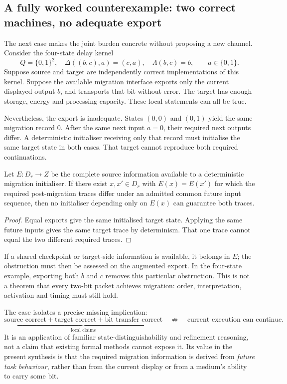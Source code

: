 \subsection{A fully worked counterexample: two correct machines, no adequate export}\label{subsec:exportcase}
The next case makes the joint burden concrete without proposing a new channel. Consider the four-state delay kernel
\[
 Q=\{0,1\}^2,\quad \Delta((b,c),a)=(c,a),\quad \Lambda(b,c)=b,
 \qquad a\in\{0,1\}.
\]
Suppose source and target are independently correct implementations of this kernel. Suppose the available migration interface exports only the current displayed output $b$, and transports that bit without error. The target has enough storage, energy and processing capacity. These local statements can all be true.

Nevertheless, the export is inadequate. States $(0,0)$ and $(0,1)$ yield the same migration record $0$. After the same next input $a=0$, their required next outputs differ. A deterministic initialiser receiving only that record must initialise the same target state in both cases. That target cannot reproduce both required continuations.

\begin{proposition}\label{prop:export}
Let $E:D_r\to Z$ be the complete source information available to a deterministic migration initialiser. If there exist $x,x'\in D_r$ with $E(x)=E(x')$ for which the required post-migration traces differ under an admitted common future input sequence, then no initialiser depending only on $E(x)$ can guarantee both traces.
\end{proposition}
\begin{proof}
Equal exports give the same initialised target state. Applying the same future inputs gives the same target trace by determinism. That one trace cannot equal the two different required traces.
\end{proof}
If a shared checkpoint or target-side information is available, it belongs in $E$; the obstruction must then be assessed on the augmented export. In the four-state example, exporting both $b$ and $c$ removes this particular obstruction. This is not a theorem that every two-bit packet achieves migration: order, interpretation, activation and timing must still hold.

The case isolates a precise missing implication:
\[
 \underbrace{\text{source correct} + \text{target correct} + \text{bit transfer correct}}_{\text{local claims}}
 \quad\not\Rightarrow\quad \text{current execution can continue}.
\]
It is an application of familiar state-distinguishability and refinement reasoning, not a claim that existing formal methods cannot expose it. Its value in the present synthesis is that the required migration information is derived from \emph{future task behaviour}, rather than from the current display or from a medium's ability to carry some bit.

